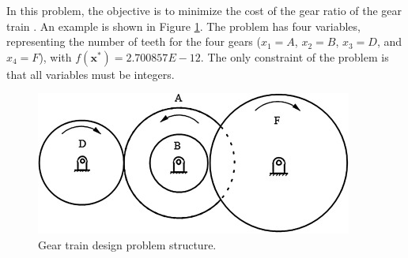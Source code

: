 
In this problem, the objective is to minimize the cost of the gear ratio of the gear train \cite{PV}. An example is shown in Figure \ref{fig:GT}. The problem has four variables, representing the number of teeth for the four gears ($x_1 = A$, $x_2 = B$, $x_3 = D$, and $x_4 = F$), with $f(\bm{x}^*) = 2.700857E \! - \! 12$. The only constraint of the problem is that all variables must be integers. %


%

\vspace{0.5cm}


\begin{figure}[h]
    \begin{center}
    \includegraphics[scale=0.5]{img/Problems/GT.jpg}
    \end{center}
    \captionsetup{justification=centering}
    \caption{Gear train design problem structure.}\label{fig:GT}
\end{figure}
